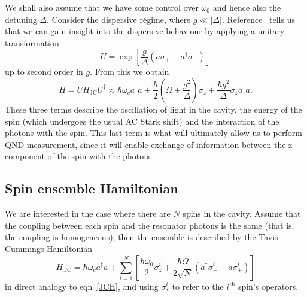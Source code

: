 We shall also assume that we have some control over $\omega_0$ and hence also
the detuning $\Delta$. Consider the dispersive r\'egime, where  $g\ll|\Delta|$.
Reference~\cite{PhysRevA.69.062320} tells us that we can gain insight into the
dispersive behaviour by applying  a unitary transformation
%
\begin{equation} U = \exp \left[\frac{g}{\Delta}(a\sigma_+ -
a^\dagger\sigma_-)\right] \end{equation}
%
up to second order in $g$.
From this we obtain
%
\begin{equation} H= UH_\text{JC}U^\dagger \approx \hbar \omega_c
  a^\dagger a + \frac{\hbar}{2}\left(\Omega +
  \frac{g^2}{\Delta}\right)\sigma_z + \frac{\hbar
  g^2}{\Delta}\sigma_z a^\dagger a.  \end{equation}
%
These three terms describe the oscillation of light in the cavity, the energy
of the spin (which undergoes the usual AC Stark shift) and the interaction of
the photons with the spin. This last term is what will ultimately allow us to
perform QND measurement, since it will enable exchange of information between
the z-component of the spin with the photons.

\subsection{Spin ensemble Hamiltonian}

We are interested in the case where there are $N$ spins in the
cavity. Assume that the coupling between each spin and the resonator photons is
the same (that is, the coupling is homogeneous), then the ensemble is described
by the Tavis-Cummings Hamiltonian~\cite{Kirton2019}
%
\begin{equation}
  H_\text{TC}=  \hbar \omega_c a^\dagger a + \sum_{i=1}^N\left[
    \frac{\hbar\omega_0}{2}\sigma_z^i +\frac{\hbar\Omega}{2\sqrt{N}}(a^\dagger
    \sigma^i_- + a\sigma^i_+)\right]
\end{equation}
%
in direct analogy to eqn~\ref{JCH}, and using $\sigma_*^i$ to refer to the
$i^\text{th}$ spin's operators.

